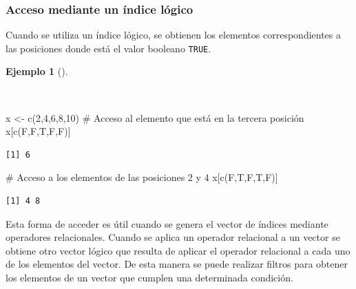 \documentclass[
  a4paper,
]{scrreport}
\newenvironment{Shaded}{\begin{snugshade}}{\end{snugshade}}
\newcommand{\CommentTok}[1]{\textcolor[rgb]{0.37,0.37,0.37}{#1}}
\newcommand{\DecValTok}[1]{\textcolor[rgb]{0.68,0.00,0.00}{#1}}
\newcommand{\FunctionTok}[1]{\textcolor[rgb]{0.28,0.35,0.67}{#1}}
\newcommand{\NormalTok}[1]{\textcolor[rgb]{0.00,0.23,0.31}{#1}}
\newcommand{\OtherTok}[1]{\textcolor[rgb]{0.00,0.23,0.31}{#1}}
\theoremstyle{definition}
\theoremstyle{definition}
\newtheorem{example}{Ejemplo}[chapter]
\theoremstyle{remark}
\begin{document}
\subsubsection{Acceso mediante un índice
lógico}\label{acceso-mediante-un-uxedndice-luxf3gico}

Cuando se utiliza un índice lógico, se obtienen los elementos
correspondientes a las posiciones donde está el valor booleano
\texttt{TRUE}.

\begin{example}[]\protect\hypertarget{exm-acceso-vector-indice-logico}{}\label{exm-acceso-vector-indice-logico}

~

\begin{Shaded}
\begin{Highlighting}[]
\NormalTok{x }\OtherTok{\textless{}{-}} \FunctionTok{c}\NormalTok{(}\DecValTok{2}\NormalTok{,}\DecValTok{4}\NormalTok{,}\DecValTok{6}\NormalTok{,}\DecValTok{8}\NormalTok{,}\DecValTok{10}\NormalTok{)}
\CommentTok{\# Acceso al elemento que está en la tercera posición}
\NormalTok{x[}\FunctionTok{c}\NormalTok{(F,F,T,F,F)]}
\end{Highlighting}
\end{Shaded}

\begin{verbatim}
[1] 6
\end{verbatim}

\begin{Shaded}
\begin{Highlighting}[]
\CommentTok{\# Acceso a los elementos de las posiciones 2 y 4}
\NormalTok{x[}\FunctionTok{c}\NormalTok{(F,T,F,T,F)]}
\end{Highlighting}
\end{Shaded}

\begin{verbatim}
[1] 4 8
\end{verbatim}

\end{example}

Esta forma de acceder es útil cuando se genera el vector de índices
mediante operadores relacionales. Cuando se aplica un operador
relacional a un vector se obtiene otro vector lógico que resulta de
aplicar el operador relacional a cada uno de los elementos del vector.
De esta manera se puede realizar filtros para obtener los elementos de
un vector que cumplen una determinada condición.
\end{document}
